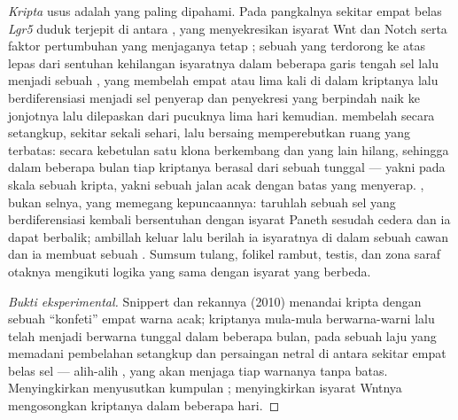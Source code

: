 \begin{proposition}\label{prop:b3:stem-cells:crypt}
%
\emph{Kripta} usus adalah  yang paling dipahami. Pada pangkalnya
sekitar empat belas  \emph{Lgr5} duduk terjepit di antara ,
yang menyekresikan isyarat Wnt dan Notch serta faktor pertumbuhan yang menjaganya
tetap ; sebuah  yang terdorong ke atas lepas dari sentuhan  kehilangan isyaratnya dalam beberapa garis tengah sel lalu menjadi sebuah
, yang membelah empat atau lima kali di dalam kriptanya
lalu berdiferensiasi menjadi sel penyerap dan penyekresi yang
berpindah naik ke jonjotnya lalu dilepaskan dari pucuknya lima hari kemudian.  membelah secara setangkup, sekitar sekali sehari, lalu bersaing memperebutkan
ruang  yang terbatas: secara kebetulan satu klona berkembang dan yang lain
hilang, sehingga dalam beberapa bulan tiap kriptanya berasal dari
sebuah  tunggal --- yakni \emph{} pada skala sebuah kripta, yakni sebuah
jalan acak dengan batas yang menyerap. , bukan selnya, yang memegang
kepuncaannya: taruhlah sebuah sel yang berdiferensiasi kembali bersentuhan dengan isyarat
Paneth sesudah cedera dan ia dapat berbalik; ambillah  keluar lalu
berilah ia isyaratnya di dalam sebuah cawan dan ia membuat sebuah . Sumsum tulang,
folikel rambut, testis, dan zona  saraf otaknya
mengikuti logika yang sama dengan isyarat yang berbeda.
\end{proposition}
\begin{proof}[Bukti eksperimental]
Snippert dan rekannya (2010) menandai  kripta dengan sebuah
``konfeti'' empat warna acak; kriptanya mula-mula berwarna-warni
lalu telah menjadi berwarna tunggal dalam beberapa bulan, pada sebuah laju yang memadani
pembelahan setangkup dan persaingan netral di antara sekitar empat belas sel
--- alih-alih , yang akan menjaga tiap warnanya
tanpa batas. Menyingkirkan  menyusutkan kumpulan ;
menyingkirkan isyarat Wntnya mengosongkan kriptanya dalam beberapa hari.
\end{proof}

